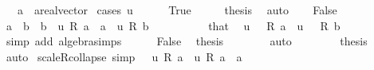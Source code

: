 \begin{isabellebody}
\ \ \ a\ {\isacharcolon}{\kern0pt}{\isacharcolon}{\kern0pt}\ {\isachardoublequoteopen}{\isacharprime}{\kern0pt}a{\isacharcolon}{\kern0pt}{\isacharcolon}{\kern0pt}real{\isacharunderscore}{\kern0pt}vector{\isachardoublequoteclose}\isanewline
%
\isadelimproof
%
\endisadelimproof
%
\isatagproof
{}\isamarkupfalse%
\ {\isacharparenleft}{\kern0pt}cases\ {\isachardoublequoteopen}u\ {\isacharequal}{\kern0pt}\ {}{\isachardoublequoteclose}{\isacharparenright}{\kern0pt}\isanewline
\ \ \isamarkupfalse%
\ True\isanewline
\ \ \isamarkupfalse%
\ \isamarkupfalse%
\ {\isacharquery}{\kern0pt}thesis\ \isamarkupfalse%
\ auto\isanewline
{}\isamarkupfalse%
\isanewline
\ \ \isamarkupfalse%
\ False\isanewline
\ \ \isamarkupfalse%
\ {\isachardoublequoteopen}a\ {\isacharequal}{\kern0pt}\ b{\isachardoublequoteclose}\ \ {\isachardoublequoteopen}b\ {\isacharplus}{\kern0pt}\ u\ {\isacharasterisk}{\kern0pt}\isactrlsub R\ a\ {\isacharequal}{\kern0pt}\ a\ {\isacharplus}{\kern0pt}\ u\ {\isacharasterisk}{\kern0pt}\isactrlsub R\ b{\isachardoublequoteclose}\isanewline
\ \ \isamarkupfalse%
\ {\isacharminus}{\kern0pt}\isanewline
\ \ \ \ \isamarkupfalse%
\ that\ \isamarkupfalse%
\ {\isachardoublequoteopen}{\isacharparenleft}{\kern0pt}u\ {\isacharminus}{\kern0pt}\ {}{\isacharparenright}{\kern0pt}\ {\isacharasterisk}{\kern0pt}\isactrlsub R\ a\ {\isacharequal}{\kern0pt}\ {\isacharparenleft}{\kern0pt}u\ {\isacharminus}{\kern0pt}\ {}{\isacharparenright}{\kern0pt}\ {\isacharasterisk}{\kern0pt}\isactrlsub R\ b{\isachardoublequoteclose}\isanewline
\ \ \ \ \ \ \isamarkupfalse%
\ {\isacharparenleft}{\kern0pt}simp\ add{\isacharcolon}{\kern0pt}\ algebra{\isacharunderscore}{\kern0pt}simps{\isacharparenright}{\kern0pt}\isanewline
\ \ \ \ \isamarkupfalse%
\ False\ \isamarkupfalse%
\ {\isacharquery}{\kern0pt}thesis\isanewline
\ \ \ \ \ \ \isamarkupfalse%
\ auto\isanewline
\ \ \isamarkupfalse%
\isanewline
\ \ \isamarkupfalse%
\ \isamarkupfalse%
\ {\isacharquery}{\kern0pt}thesis\ \isamarkupfalse%
\ auto\isanewline
{}\isamarkupfalse%
%
\endisatagproof
{\isafoldproof}%
%
\isadelimproof
\isanewline
%
\endisadelimproof
\isanewline
{}\isamarkupfalse%
\ scaleR{\isacharunderscore}{\kern0pt}collapse\ {\isacharbrackleft}{\kern0pt}simp{\isacharbrackright}{\kern0pt}{\isacharcolon}{\kern0pt}\ {\isachardoublequoteopen}{\isacharparenleft}{\kern0pt}{}\ {\isacharminus}{\kern0pt}\ u{\isacharparenright}{\kern0pt}\ {\isacharasterisk}{\kern0pt}\isactrlsub R\ a\ {\isacharplus}{\kern0pt}\ u\ {\isacharasterisk}{\kern0pt}\isactrlsub R\ a\ {\isacharequal}{\kern0pt}\ a{\isachardoublequoteclose}\isanewline

\end{isabellebody}
